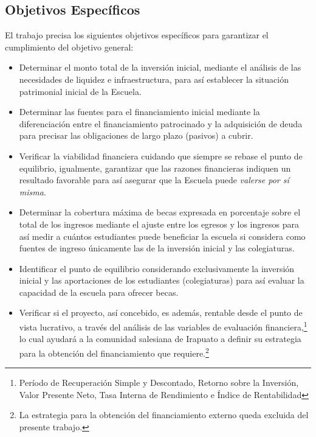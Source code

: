

\subsection{Objetivos Específicos}

El trabajo precisa los siguientes objetivos específicos para garantizar el cumplimiento del objetivo general:

\begin{itemize}
	\item Determinar el monto total de la inversión inicial, mediante el análisis de las necesidades de liquidez e infraestructura, para así establecer la situación patrimonial inicial de la Escuela.
	\item Determinar las fuentes para el financiamiento inicial mediante la diferenciación entre el financiamiento patrocinado y la adquisición de deuda para precisar las obligaciones de largo plazo (pasivos) a cubrir.
	\item Verificar la viabilidad financiera cuidando que siempre se rebase el punto de equilibrio, igualmente, garantizar que las razones financieras indiquen un resultado favorable para así asegurar que la Escuela puede \emph{valerse por sí misma}.
	\item Determinar la cobertura máxima de becas expresada en porcentaje sobre el total de los ingresos mediante el ajuste entre los egresos y los ingresos para así medir a cuántos estudiantes puede beneficiar la escuela si considera como fuentes de ingreso únicamente las de la inversión inicial y las colegiaturas.
	\item Identificar el punto de equilibrio considerando exclusivamente la inversión inicial y las aportaciones de los estudiantes (colegiaturas) para así evaluar la capacidad de la escuela para ofrecer becas.
	\item Verificar si el proyecto, así concebido, es además, rentable desde el punto de vista lucrativo, a través del análisis de las variables de evaluación financiera,\footnote{\label{note:VariablesEvaluacionFinanciera}Período de Recuperación Simple y Descontado, Retorno sobre la Inversión, Valor Presente Neto, Tasa Interna de Rendimiento e Índice de Rentabilidad} lo cual ayudará a la comunidad salesiana de Irapuato a definir su estrategia para la obtención del financiamiento que requiere.\footnote{La estrategia para la obtención del financiamiento externo queda excluida del presente trabajo.}
\end{itemize}

